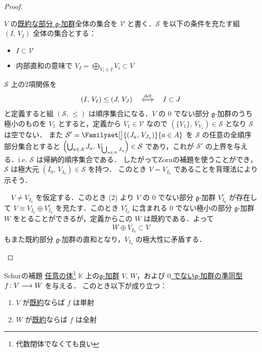 \documentclass[rep_main]{subfiles}
\begin{document}
\begin{proof}
\begin{description}
		$V$ の\hyperref[def:irr]{既約な部分 $\mathfrak{g}$-加群}全体の集合を $\mathcal{V}$ と書く．$\mathcal{S}$ を以下の条件を充たす組 $(I,\, V_I)$ 全体の集合とする：
		\begin{itemize}
			\item $I \subset \mathcal{V}$
			\item 内部直和の意味で $V_I = \bigoplus_{V_i \in I} V_i \subset V$
		\end{itemize}
		$\mathcal{S}$ 上の2項関係を
		\begin{align}
			(I,\, V_I) \le (J,\, V_J) \quad\stackrel{\mathrm{def}}{\Longleftrightarrow}\quad I \subset J
		\end{align}
		と定義すると組 $(\mathcal{S},\, \le)$ は順序集合になる．$V$ の $0$ でない部分 $\mathfrak{g}$-加群のうち極小のものを $V_1$ とすると，定義から $V_1 \in \mathcal{V}$ なので $(\{V_1\},\, V_{V_1}) \in \mathcal{S}$ となり $\mathcal{S}$ は空でない．
		また $\mathcal{S}' = \Familyset[\big]{(J_a,\, V_{J_a})}{a \in A}$ を $\mathcal{S}$ の任意の全順序部分集合とすると $\Bigl(\bigcup_{a\in A} J_a,\, V_{\bigcup_{a \in A} J_a}\Bigr) \in \mathcal{S}$ であり，これが $\mathcal{S}'$ の上界を与える．i.e. $\mathcal{S}$ は帰納的順序集合である．
		したがってZornの補題を使うことができ，$\mathcal{S}$ は極大元 $(I_0,\, V_{I_0}) \in \mathcal{S}$ を持つ．
		このとき $V = V_{I_0}$ であることを背理法により示そう．

		　$V \neq V_{I_0}$ を仮定する．このとき (2) より $V$ の $0$ でない部分 $\mathfrak{g}$-加群 $V_{I_0}^c$ が存在して $V \cong V_{I_0} \oplus V_{I_0}^c$ を充たす．このとき $V_{I_0}^c$ に含まれる $0$ でない極小の部分 $\mathfrak{g}$-加群 $W$ をとることができるが，定義からこの $W$ は既約である．よって
		\begin{align}
			W \oplus V_{I_0} \subset V
		\end{align}
		もまた既約部分 $\mathfrak{g}$-加群の直和となり，$V_{I_0}$ の極大性に矛盾する．
	\end{description}
	
\end{proof}

\begin{mylem}[label=lem:Schur]{Schurの補題}
	\underline{任意の体}\footnote{代数閉体でなくても良い} $\mathbb{K}$ 上の\hyperref[ax:g-module]{$\mathfrak{g}$-加群} $V,\, W$，および \underline{$0$ でない}\hyperref[def:g-module-hom]{$\mathfrak{g}$-加群の準同型} $f \colon V \longrightarrow W$ を与える．
	このとき以下が成り立つ：
	\begin{enumerate}
		\item $V$ が\hyperref[def:irr]{既約}ならば $f$ は単射
		\item $W$ が\hyperref[def:irr]{既約}ならば $f$ は全射
	\end{enumerate}
	
\end{mylem}
\end{document}
